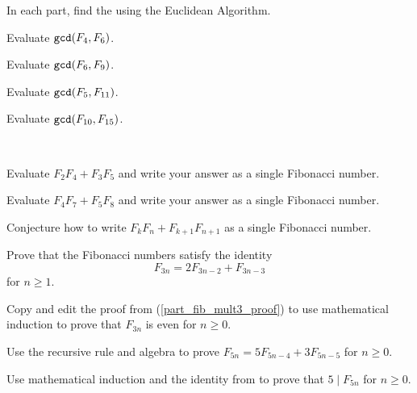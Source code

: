 \begin{exer}[\exerP] %
\label{exer_fib_gcd_eval}
    In each part, find the  using the Euclidean Algorithm.
        \begin{exerpart}
            \item Evaluate $\texttt{gcd}(F_4,F_6)$.
            \item Evaluate $\texttt{gcd}(F_6,F_9)$.
            \item Evaluate $\texttt{gcd}(F_5,F_{11})$.
            \item Evaluate $\texttt{gcd}(F_{10},F_{15})$.
        \end{exerpart}
\end{exer}

\begin{exer}[\exerU] %
\label{exer_fib_honsberger}
~
    \begin{apart}
        \item Evaluate $F_2F_4+F_3F_5$ and write your answer as a single Fibonacci number.
        \item Evaluate $F_4F_7+F_5F_8$ and write your answer as a single Fibonacci number.
        \item Conjecture how to write $F_kF_n+F_{k+1}F_{n+1}$ as a single Fibonacci number.
    \end{apart}
\end{exer}

\begin{exer}[\exerU] %
\label{exer_even_fib_identity}
    Prove that the Fibonacci numbers satisfy the identity
        $$F_{3n}= 2F_{3n-2}+F_{3n-3}$$ 
    for $n \ge 1$.  
\end{exer}

\begin{exer}[\exerU] %
\label{exer_even_fib_proof}
    Copy and edit the proof from  (\ref{part_fib_mult3_proof}) to use mathematical induction to prove that $F_{3n}$ is even for $n \ge 0$.   
\end{exer}

\begin{exer}[\exerU] %
\label{exer_mult5_fib_identity}
    Use the recursive rule and algebra to prove $F_{5n} =5F_{5n-4} + 3F_{5n-5}$ for $n \ge 0$.
\end{exer}

\begin{exer} [\exerU] %
\label{exer_fib_div5_proof}
    Use mathematical induction and the identity from  to prove that $5 \mid F_{5n}$ for $n \ge 0$.
\end{exer}

